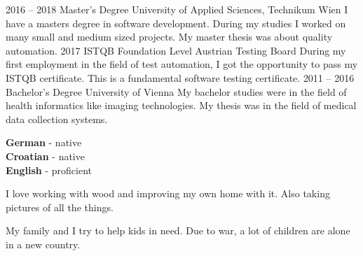 \documentclass[9pt]{developercv} %
\begin{document}


\begin{entrylist}
	\entry
		{2016 -- 2018}
		{Master's Degree}
		{University of Applied Sciences, Technikum Wien}
		{I have a masters degree in software development. During my studies I worked on many small and medium sized projects. My master thesis was about quality automation.}
	\entry
		{2017}
		{ISTQB Foundation Level}
		{Austrian Testing Board}
		{During my first employment in the field of test automation, I got the opportunity to pass my ISTQB certificate. This is a fundamental software testing certificate.}
	\entry
		{2011 -- 2016}
		{Bachelor's Degree}
		{University of Vienna}
		{My bachelor studies were in the field of health informatics like imaging technologies. My thesis was in the field of medical data collection systems.}
\end{entrylist}


\begin{minipage}[t]{0.3\textwidth}
	\vspace{-\baselineskip} %

	
	\textbf{German} - native\\
	\textbf{Croatian} - native\\
	\textbf{English} - proficient
\end{minipage}
\hfill
\begin{minipage}[t]{0.3\textwidth}
	\vspace{-\baselineskip} %
	
	
	I love working with wood and improving my own home with it. Also taking pictures of all the things.
\end{minipage}
\hfill
\begin{minipage}[t]{0.3\textwidth}
	\vspace{-\baselineskip} %
	
	
	My family and I try to help kids in need. Due to war, a lot of children are alone in a new country.
\end{minipage}

\end{document}
